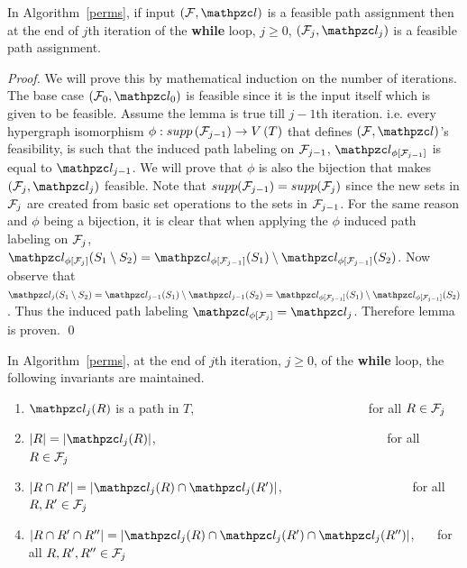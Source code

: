 \documentclass[MS]             %
              {iitmdiss_as}    %
\begin{document}
\begin{lemma} 
 \label{lem:feasible} 
 In Algorithm~\ref{perms}, if input $(\cF, \cl)$ is a feasible path
 assignment then at the end of $j$th iteration of the {\bf while}
 loop, $j \ge 0$, $(\cF_j, \cl_j)$ is a feasible path assignment.
\end{lemma}
\begin{proof}%
  We will prove this by mathematical induction on the number of
  iterations. The base case $(\cF_0, \cl_0)$ is feasible since it is
  the input itself which is given to be feasible. Assume the lemma is
  true till $j-1$th iteration. i.e. every hypergraph isomorphism
  $\phi: supp\left({\cal F}_{j-1}\right) \rightarrow V\left(T \right)$ that
  defines $(\cF, \cl)$'s feasibility, is such that the induced path
  labeling on ${\cal F}_{j-1}$, $\cl_{\phi[{\cF_{j-1}}]}$ is equal to
  $\cl_{j-1}$. We will prove that $\phi$ is also the bijection that
  makes $(\cF_j, \cl_j)$ feasible. Note that $supp({\cal F}_{j-1}) =
  supp({\cal F}_{j})$ since the new sets in ${\cal F}_j$ are created from basic
  set operations to the sets in ${\cal F}_{j-1}$. For the same reason and
  $\phi$ being a bijection, it is clear that when applying the $\phi$
  induced path labeling on ${\cal F}_j$, $ \cl_{\phi[{\cF_{j}}]}(S_1
  \setminus S_2) = \cl_{\phi[{\cF_{j-1}}]}(S_1) \setminus
  \cl_{\phi[{\cF_{j-1}}]}(S_2)$. Now observe that $ \cl_j(S_1
  \setminus S_2) = \cl_{j-1}(S_1) \setminus \cl_{j-1}(S_2) =
  \cl_{\phi[{\cF_{j-1}}]}(S_1) \setminus
  \cl_{\phi[{\cF_{j-1}}]}(S_2)$. Thus the induced path labeling
  $\cl_{\phi[{\cF_{j}}]} = \cl_{j}$. Therefore lemma is proven.  \qed
\end{proof}

\begin{lemma}
  \label{lem:invar1} In Algorithm~\ref{perms}, at the end of $j$th
  iteration, $j \ge 0$, of the {\bf while} loop, the following
  invariants are maintained.
  \begin{enumerate}[I {\ }] %
  \item $\cl_j(R)$ is a path in $T$, \ \ \ \ \ \ \ \ \ \ \ \ \ \ \ \ \
    \ \ \ \ \ \ \ \ \ \ for all $R \in {\cal F}_j$%
  \item $|R| = |\cl_j(R)|$, \ \ \ \ \ \ \ \ \ \ \ \ \ \ \ \ \ \ \ \ \
    \ \ \ \ \ \ \ \ \ \ \ \ \ \ \ for all $R \in
    {\cal F}_j$%
  \item $|R \cap R'| = |\cl_j(R) \cap \cl_j(R')|$, \ \ \ \ \ \ \ \ \ \
    \ \ \ \ \ \ \ \ \ \ for all $R, R' \in {\cal F}_j$%
  \item $|R \cap R' \cap R''|=|\cl_j(R) \cap \cl_j(R') \cap
    \cl_j(R'')|$, \ \ \ for all $R, R', R'' \in {\cal F}_j$
  \end{enumerate}
\end{lemma}
\end{document}
